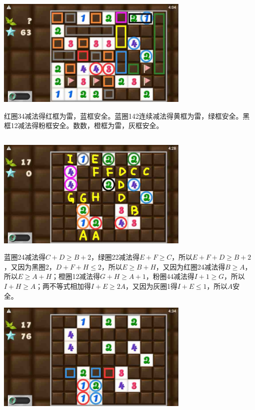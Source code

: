 \begin{center}
    \includegraphics[width=0.7\textwidth]{puzzlelow/249-3.jpg}
\end{center}
红圈34减法得红框为雷，蓝框安全。蓝圈142连续减法得黄框为雷，绿框安全。黑框12减法得粉框安全。数数，橙框为雷，灰框安全。

\subsection{} %
\begin{center}
    \includegraphics[width=0.7\textwidth]{puzzlelow/250-1.jpg}
\end{center}
蓝圈24减法得$C+D\ge B+2$，绿圈22减法得$E+F\ge C$，所以$E+F+D\ge B+2$，又因为黑圈2，$D+F+H\le 2$，所以$E\ge B+H$，又因为红圈24减法得$B\ge A$，所以$E\ge A+H$；橙圈12减法得$G+H\ge A+1$，粉圈44减法得$I+1\ge G$，所以$I+H\ge A$；两不等式相加得$I+E\ge 2A$，又因为灰圈1得$I+E\le 1$，所以$A$安全。
\begin{center}
    \includegraphics[width=0.7\textwidth]{puzzlelow/250-2.jpg}
\end{center}
